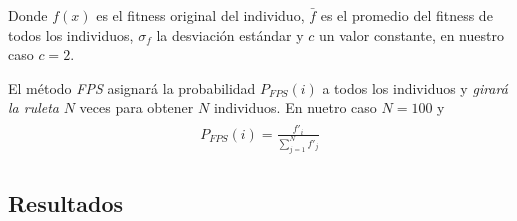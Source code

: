 \documentclass[10pt,letterpaper]{article}
\begin{document}
Donde $f(x)$ es el fitness original del individuo, $\bar{f}$ es el promedio del fitness
de todos los individuos, $\sigma_f$ la desviación estándar y $c$ un valor constante,
en nuestro caso $c=2$.

El método \textit{FPS} asignará la probabilidad $P_{FPS}(i)$ a todos los individuos
y \textit{girará la ruleta} $N$ veces para obtener $N$ individuos. En nuetro caso
$N=100$ y
    \begin{equation*} \begin{split} \begin{gathered}
        P_{FPS}(i) = \frac{f'_i}{\sum_{j=1}^{N} f'_j}
    \end{gathered} \end{split} \end{equation*}

\clearpage
\subsection{Resultados}
\end{document}
